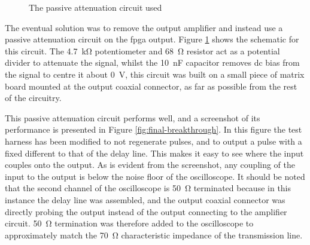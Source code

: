 \begin{figure}[ht]
	\centering
	\caption{The passive attenuation circuit used}
	\label{fig:output-passive-attenuator}
\end{figure}

The eventual solution was to remove the output amplifier and instead use a passive attenuation circuit on the \gls{fpga} output. Figure \ref{fig:output-passive-attenuator} shows the schematic for this circuit. The \SI{4.7}{\kilo\ohm} potentiometer and \SI{68}{\ohm} resistor act as a potential divider to attenuate the signal, whilst the \SI{10}{\nano\farad} capacitor removes \gls{dc} bias from the signal to centre it about \SI{0}{\volt}, this circuit was built on a small piece of matrix board mounted at the output coaxial connector, as far as possible from the rest of the circuitry.

This passive attenuation circuit performs well, and a screenshot of its performance is presented in Figure \ref{fig:final-breakthrough}. In this figure the test harness has been modified to not regenerate pulses, and to output a pulse with a fixed different to that of the delay line. This makes it easy to see where the input couples onto the output. As is evident from the screenshot, any coupling of the input to the output is below the noise floor of the oscilloscope. It should be noted that the second channel of the oscilloscope is \SI{50}{\ohm} terminated because in this instance the delay line was assembled, and the output coaxial connector was directly probing the output instead of the output connecting to the amplifier circuit. \SI{50}{\ohm} termination was therefore added to the oscilloscope to approximately match the \SI{70}{\ohm} characteristic impedance of the transmission line.

